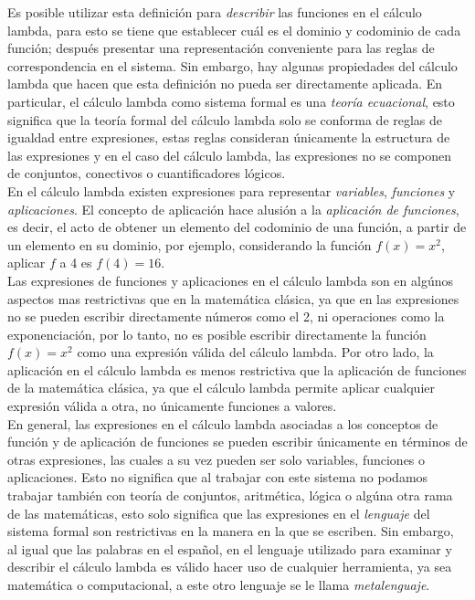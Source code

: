 Es posible utilizar esta definición para \emph{describir} las funciones en el
cálculo lambda, para esto se tiene que establecer cuál es el dominio y codominio de
cada función; después presentar una representación conveniente para las reglas
de correspondencia en el sistema. Sin embargo, hay algunas propiedades del
cálculo lambda que hacen que esta definición no pueda ser directamente aplicada.
En particular, el cálculo lambda como sistema formal es una \emph{teoría
  ecuacional}, esto significa que la teoría formal del cálculo lambda solo se
conforma de reglas de igualdad entre expresiones, estas reglas consideran
únicamente la estructura de las expresiones y en el caso del cálculo lambda, las
expresiones no se componen de conjuntos, conectivos o cuantificadores lógicos.\\

En el cálculo lambda existen expresiones para representar \emph{variables},
\emph{funciones} y \emph{aplicaciones}. El concepto de aplicación hace alusión a
la \emph{aplicación de funciones}, es decir, el acto de obtener un elemento del
codominio de una función, a partir de un elemento en su dominio, por ejemplo,
considerando la función \(f(x)=x^2\), aplicar \(f\) a 4 es \(f(4)=16\).\\

Las expresiones de funciones y aplicaciones en el cálculo lambda son en algúnos
aspectos mas restrictivas que en la matemática clásica, ya que en las
expresiones no se pueden escribir directamente números como el 2, ni operaciones
como la exponenciación, por lo tanto, no es posible escribir directamente la
función \(f(x)=x^2\) como una expresión válida del cálculo lambda. Por otro
lado, la aplicación en el cálculo lambda es menos restrictiva que la aplicación
de funciones de la matemática clásica, ya que el cálculo lambda permite aplicar
cualquier expresión válida a otra, no únicamente funciones a valores.\\

En general, las expresiones en el cálculo lambda asociadas a los conceptos de
función y de aplicación de funciones se pueden escribir únicamente en términos
de otras expresiones, las cuales a su vez pueden ser solo variables, funciones o
aplicaciones. Esto no significa que al trabajar con este sistema no podamos
trabajar también con teoría de conjuntos, aritmética, lógica o algúna otra rama
de las matemáticas, esto solo significa que las expresiones en el
\emph{lenguaje} del sistema formal son restrictivas en la manera en la que se
escriben. Sin embargo, al igual que las palabras en el español, en el lenguaje
utilizado para examinar y describir el cálculo lambda es válido hacer uso de
cualquier herramienta, ya sea matemática o computacional, a este otro lenguaje
se le llama \emph{metalenguaje}.\\

